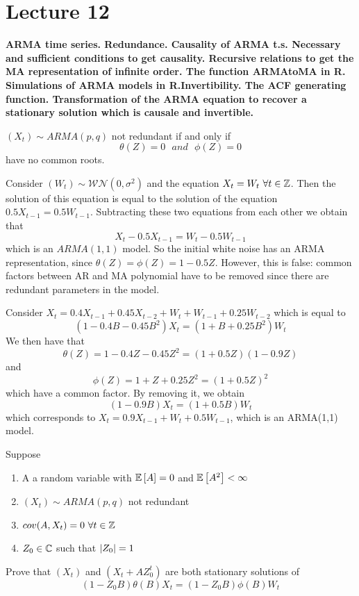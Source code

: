 \section{Lecture 12}
\label{lecture12}

\begin{center}
    \textbf{ARMA time series. Redundance. Causality of ARMA t.s. Necessary and sufficient conditions to get causality. Recursive relations to get the MA representation of infinite order. The function ARMAtoMA in R. Simulations of ARMA models in R.Invertibility. The ACF generating function. Transformation of the ARMA equation to recover a stationary solution which is causale and invertible.}
\end{center}

\begin{definition}
    $(X_t)\sim ARMA(p,q)$ not redundant if and only if
    \[
        \theta(Z)=0\ \ \ and\ \ \ \phi(Z)=0  
    \]
    have no common roots.
\end{definition}

\begin{example}
    Consider $(W_t)\sim\mathcal{WN}(0,\sigma^2)$ and the equation $X_t=W_t\ \forall t\in\mathbb{Z}$. Then the solution of this equation is equal to the solution of the equation $0.5X_{t-1}=0.5W_{t-1}$. Subtracting these two equations from each other we obtain that
    \[
        X_t-0.5X_{t-1}=W_t-0.5W_{t-1}  
    \] 
    which is an $ARMA(1,1)$ model. So the initial white noise has an ARMA representation, since $\theta(Z)=\phi(Z)=1-0.5Z$. However, this is false: common factors between AR and MA polynomial have to be removed since there are redundant parameters in the model.
\end{example}

\begin{example}
    Consider $X_t=0.4X_{t-1}+0.45X_{t-2}+W_t+W_{t-1}+0.25W_{t-2}$ which is equal to
    \[
        (1-0.4B-0.45B^2)X_t=(1+B+0.25B^2)W_t
    \]
    We then have that
    \[
        \theta(Z)=1-0.4Z-0.45Z^2=(1+0.5Z)(1-0.9Z)  
    \]
    and 
    \[
        \phi(Z)=1+Z+0.25Z^2=(1+0.5Z)^2 
    \]
    which have a common factor. By removing it, we obtain
    \[
        (1-0.9B)X_t=(1+0.5B)W_t
    \]
    which corresponds to $X_t=0.9X_{t-1}+W_t+0.5W_{t-1}$, which is an ARMA(1,1) model.
\end{example}

\begin{exercise}
    Suppose
    \begin{enumerate}
        \item A a random variable with $\mathbb{E}\left[A\right]=0$ and $\mathbb{E}\left[A^2\right]<\infty$
        \item $(X_t)\sim ARMA(p,q)$ not redundant
        \item $cov(A,X_t)=0\ \forall t\in\mathbb{Z}$
        \item $Z_0\in\mathbb{C}$ such that $\left|Z_0\right|=1$
    \end{enumerate}
    Prove that $(X_t)$ and $(X_t+AZ_0^t)$ are both stationary solutions of
    \[
        (1-Z_0B)\theta(B)X_t=(1-Z_0B)\phi(B)W_t
    \]
\end{exercise}

